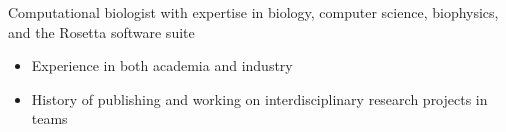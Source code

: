 
Computational biologist with expertise in biology, computer science, biophysics, and the Rosetta software suite
\begin{itemize}
\item Experience in both academia and industry
\item History of publishing and working on interdisciplinary research projects in teams
\end{itemize}
